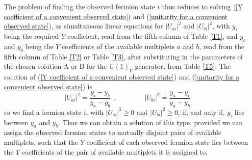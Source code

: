 \documentclass[a4paper,12pt,oneside]{article}
\begin{document}
The problem of finding the observed fermion state $i$ thus reduces
to solving (\ref{Y coefficient of a convenient observed state}) and
(\ref{unitarity for a convenient observed state}), as simultaneous
linear equations for $\vert U_{ai}\vert^2$ and
$\vert U_{bi}\vert^2$, with $y_i$ being the required $Y$ 
coefficient, read from the fifth column of Table \ref{T1}, and $y_a$
and $y_b$ being the $Y$ coefficients of the available multiplets $a$
and $b$, read from the fifth column of Table \ref{T2} or Table
\ref{T3}, after substituting in the parameters of the chosen 
solution A or B for the $\mathrm{U}(1)_Y$ generator, from Table 
\ref{T5}.  The solution of
(\ref{Y coefficient of a convenient observed state}) and
(\ref{unitarity for a convenient observed state}) is
\begin{equation}\label{solution of the two equations}
\vert U_{ai}\vert^2=\frac{y_i-y_b}{y_a-y_b}\:\:,
\qquad\qquad
\vert U_{bi}\vert^2=\frac{y_a-y_i}{y_a-y_b}
\end{equation}
so we find a fermion state $i$, with $\vert U_{ai}\vert^2\geq 0$ and
$\vert U_{bi}\vert^2\geq 0$, if, and only if,
$y_i$ lies between $y_a$ and $y_b$.  Thus we can obtain a solution
of this type, provided we can assign the observed fermion
states to mutually disjoint pairs of available multiplets,
such that the $Y$ coefficient of each observed fermion state lies
between the $Y$ coefficients of the pair of available multiplets it
is assigned to.
\end{document}
